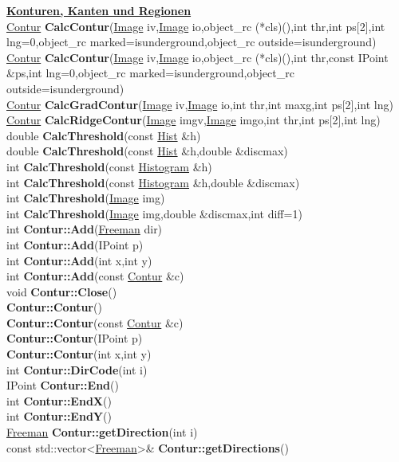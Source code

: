\documentclass[10pt,titlepage]{article}
\newcommand{\subtitle}[1]{{\noindent\bf#1}}
\def\functionlistentry#1#2#3#4#5#6{\noindent #1 {\bf #2}(#3) \dotfill #6\\}
\begin{document}
{{\subtitle{\hyperlink{SECTION:conturs}{Konturen, Kanten und Regionen}}\\
\functionlistentry{\hyperlink{Contur}{Contur}}{CalcContur}{\hyperlink{Image}{Image} iv,\hyperlink{Image}{Image} io,object\_rc (*cls)(),int thr,int ps[2],int lng=0,object\_rc marked=isunderground,object\_rc outside=isunderground}{440}{conturs}{}
\functionlistentry{\hyperlink{Contur}{Contur}}{CalcContur}{\hyperlink{Image}{Image} iv,\hyperlink{Image}{Image} io,object\_rc (*cls)(),int thr,const IPoint \&ps,int lng=0,object\_rc marked=isunderground,object\_rc outside=isunderground}{441}{conturs}{}
\functionlistentry{\hyperlink{Contur}{Contur}}{CalcGradContur}{\hyperlink{Image}{Image} iv,\hyperlink{Image}{Image} io,int thr,int maxg,int ps[2],int lng}{449}{conturs}{}
\functionlistentry{\hyperlink{Contur}{Contur}}{CalcRidgeContur}{\hyperlink{Image}{Image} imgv,\hyperlink{Image}{Image} imgo,int thr,int ps[2],int lng}{452}{conturs}{}
\functionlistentry{double}{CalcThreshold}{const \hyperlink{Hist}{Hist} \&h}{432}{conturs}{}
\functionlistentry{double}{CalcThreshold}{const \hyperlink{Hist}{Hist} \&h,double \&discmax}{433}{conturs}{}
\functionlistentry{int}{CalcThreshold}{const \hyperlink{Histogram}{Histogram} \&h}{434}{conturs}{}
\functionlistentry{int}{CalcThreshold}{const \hyperlink{Histogram}{Histogram} \&h,double \&discmax}{435}{conturs}{}
\functionlistentry{int}{CalcThreshold}{\hyperlink{Image}{Image} img}{436}{conturs}{}
\functionlistentry{int}{CalcThreshold}{\hyperlink{Image}{Image} img,double \&discmax,int diff=1}{437}{conturs}{}
\functionlistentry{int}{Contur::Add}{\hyperlink{Freeman}{Freeman} dir}{400}{conturs}{}
\functionlistentry{int}{Contur::Add}{IPoint p}{401}{conturs}{}
\functionlistentry{int}{Contur::Add}{int x,int y}{402}{conturs}{}
\functionlistentry{int}{Contur::Add}{const \hyperlink{Contur}{Contur} \&c}{403}{conturs}{}
\functionlistentry{void}{Contur::Close}{}{405}{conturs}{}
\functionlistentry{}{Contur::Contur}{}{391}{conturs}{}
\functionlistentry{}{Contur::Contur}{const \hyperlink{Contur}{Contur} \&c}{392}{conturs}{}
\functionlistentry{}{Contur::Contur}{IPoint p}{393}{conturs}{}
\functionlistentry{}{Contur::Contur}{int x,int y}{394}{conturs}{}
\functionlistentry{int}{Contur::DirCode}{int i}{425}{conturs}{}
\functionlistentry{IPoint}{Contur::End}{}{413}{conturs}{}
\functionlistentry{int}{Contur::EndX}{}{416}{conturs}{}
\functionlistentry{int}{Contur::EndY}{}{417}{conturs}{}
\functionlistentry{\hyperlink{Freeman}{Freeman}}{Contur::getDirection}{int i}{420}{conturs}{}
\functionlistentry{const std::vector\textless {}\hyperlink{Freeman}{Freeman}\textgreater {}\&}{Contur::getDirections}{}{421}{conturs}{}
}}
\end{document}
